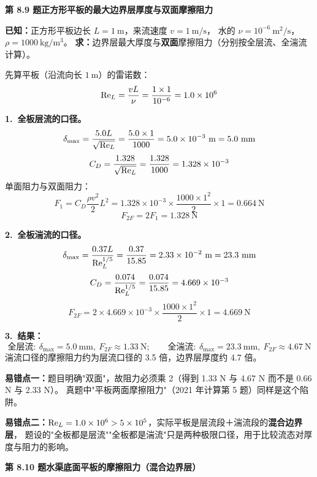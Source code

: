 \noindent\textbf{第 8.9 题\quad 正方形平板的最大边界层厚度与双面摩擦阻力}

\begin{jie}
\textbf{已知：}正方形平板边长 $L=1\ \mathrm{m}$，来流速度 $v=1\ \mathrm{m/s}$，
水的 $\nu=10^{-6}\ \mathrm{m^2/s}$，$\rho=1000\ \mathrm{kg/m^3}$。
\textbf{求：}边界层最大厚度与\textbf{双面}摩擦阻力（分别按全层流、全湍流计算）。

先算平板（沿流向长 $1\ \mathrm{m}$）的雷诺数：
\[
\mathrm{Re}_L=\frac{vL}{\nu}=\frac{1\times1}{10^{-6}}=1.0\times10^6
\]

\textbf{1.\ 全板层流的口径。}
\[
\delta_{\max}=\frac{5.0L}{\sqrt{\Rey_L}}=\frac{5.0\times1}{1000}=5.0\times10^{-3}\ \mathrm{m}=5.0\ \mathrm{mm}
\]
\[
C_D=\frac{1.328}{\sqrt{\mathrm{Re}_L}}=\frac{1.328}{1000}=1.328\times10^{-3}
\]
单面阻力与双面阻力：
\[
F_1=C_D\frac{\rho v^2}{2}L^2
=1.328\times10^{-3}\times\frac{1000\times1^2}{2}\times1=0.664\ \mathrm{N}
\]
\[
F_{2F}=2F_1=1.328\ \mathrm{N}
\]

\textbf{2.\ 全板湍流的口径。}
\[
\delta_{\max}=\frac{0.37L}{\Rey_L^{1/5}}=\frac{0.37}{15.85}=2.33\times10^{-2}\ \mathrm{m}=23.3\ \mathrm{mm}
\]
\[
C_D=\frac{0.074}{\mathrm{Re}_L^{1/5}}=\frac{0.074}{15.85}=4.669\times10^{-3}
\]
\[
F_{2F}=2\times4.669\times10^{-3}\times\frac{1000\times1^2}{2}\times1=4.669\ \mathrm{N}
\]

\textbf{3.\ 结果：}
\[
\boxed{\,\text{全层流}:\ \delta_{\max}=5.0\ \mathrm{mm},\ F_{2F}\approx1.33\ \mathrm{N};\qquad
\text{全湍流}:\ \delta_{\max}=23.3\ \mathrm{mm},\ F_{2F}\approx4.67\ \mathrm{N}\,}
\]
湍流口径的摩擦阻力约为层流口径的 3.5 倍，边界层厚度约 4.7 倍。
\end{jie}

\begin{yicuo}
\textbf{易错点一：}题目明确"双面"，故阻力必须乘 2（得到 1.33 N 与 4.67 N 而不是 0.66 N 与 2.33 N）。
真题中"平板两面摩擦阻力"（2021 年计算第 5 题）同样是这个陷阱。

\textbf{易错点二：}$\mathrm{Re}_L=1.0\times10^6>5\times10^5$，实际平板是层流段＋湍流段的\textbf{混合边界层}，
题设的"全板都是层流""全板都是湍流"只是两种极限口径，用于比较流态对厚度与阻力的影响。
\end{yicuo}

\noindent\textbf{第 8.10 题\quad 水渠底面平板的摩擦阻力（混合边界层）}

